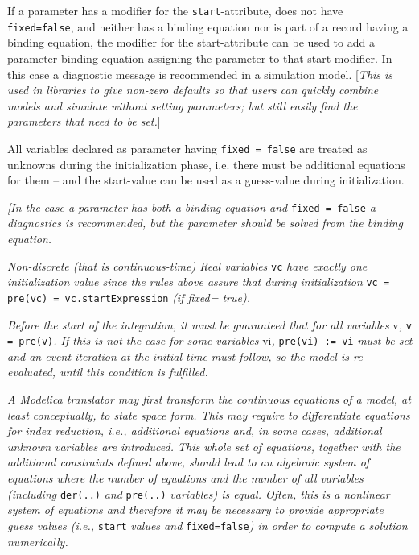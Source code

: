 If a parameter has a modifier for the \lstinline!start!-attribute, does not have
\lstinline!fixed=false!, and neither has a binding equation nor is part of a record
having a binding equation, the modifier for the start-attribute can be
used to add a parameter binding equation assigning the parameter to that
start-modifier. In this case a diagnostic message is recommended in a
simulation model. {[}\emph{This is used in libraries to give non-zero
defaults so that users can quickly combine models and simulate without
setting parameters; but still easily find the parameters that need to be
set.}{]}

All variables declared as parameter having \lstinline!fixed = false! are treated as
unknowns during the initialization phase, i.e. there must be additional
equations for them -- and the start-value can be used as a guess-value
during initialization.

\emph{{[}In the case a parameter has both a binding equation and} \lstinline!fixed = false!
\emph{a diagnostics is recommended, but the parameter should be solved
from the binding equation.}

\emph{Non-discrete (that is continuous-time) Real variables} \lstinline!vc!
\emph{have exactly one initialization value since the rules above assure
that during initialization} \lstinline!vc = pre(vc) = vc.startExpression!
\emph{(if fixed= true).}

\emph{Before the start of the integration, it must be guaranteed that
for all variables} v\emph{,} \lstinline!v = pre(v)!\emph{. If this is not
the case for some variables} vi\emph{,} \lstinline!pre(vi) := vi! \emph{must be set and an event iteration at the initial time must follow, so
the model is re-evaluated, until this condition is fulfilled.}

\emph{A Modelica translator may first transform the continuous equations
of a model, at least conceptually, to state space form. This may require
to differentiate equations for index reduction, i.e., additional
equations and, in some cases, additional unknown variables are
introduced. This whole set of equations, together with the additional
constraints defined above, should lead to an algebraic system of
equations where the number of equations and the number of all variables
(including} \lstinline!der(..)! \emph{and} \lstinline!pre(..)! \emph{variables) is equal. Often,
this is a nonlinear system of equations and therefore it may be
necessary to provide appropriate guess values (i.e.,} \lstinline!start! \emph{values
and} \lstinline!fixed=false!\emph{) in order to compute a solution numerically.}

